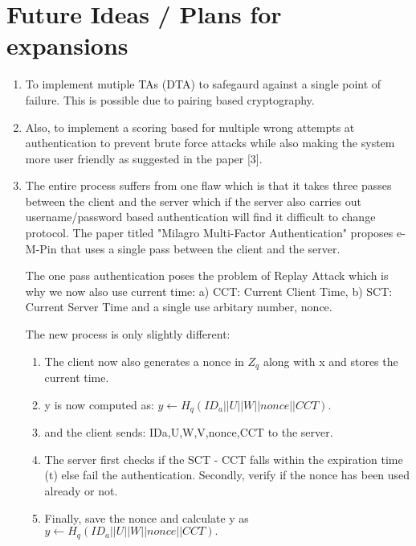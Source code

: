 \documentclass[]{article}   %
\begin{document}
\section*{Future Ideas / Plans for expansions}
\begin{enumerate}
    \item To implement mutiple TAs (DTA) to safegaurd against a single  point of failure. This is possible due to pairing based cryptography.
    \item Also, to implement a scoring based for multiple wrong attempts at authentication to prevent brute force attacks while also making the system more user friendly as suggested in the paper [3]. 
    \item The entire process suffers from one flaw which is that it takes three passes between the client and the server which if the server also carries out username/password based authentication will find it difficult to change protocol. The paper titled "Milagro Multi-Factor Authentication" proposes e-M-Pin that uses a single pass between the client and the server.

    The one pass authentication poses the problem of Replay Attack which is why we now also use current time: a) CCT: Current Client Time, b) SCT: Current Server Time and a single use arbitary number, nonce.
    
    The new process is only slightly different:
    \begin{enumerate}
        \item The client now also generates a nonce in $Z_q$ along with x and stores the current time.
        \item y is now computed as: $y \leftarrow H_q (ID_a || U || W || nonce || CCT).$
        \item and the client sends: {IDa,U,W,V,nonce,CCT} to the server.
        \item The server first checks if the SCT - CCT falls within the expiration time (t) else fail the authentication. Secondly, verify if the nonce has been used already or not.
        \item Finally, save the nonce and calculate y as \newline $y \leftarrow H_q (ID_a || U || W || nonce || CCT).$
    \end{enumerate}
    
\end{enumerate}


\nocite{*}


\end{document}
